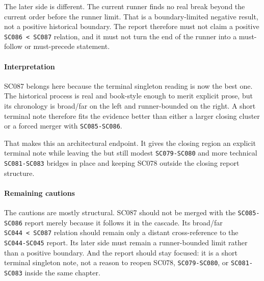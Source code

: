\documentclass[
  british,
  a4paper,
]{article}
\begin{document}
The later side is different. The current runner finds no real break
beyond the current order before the runner limit. That is a
boundary-limited negative result, not a positive historical boundary.
The report therefore must not claim a positive
\texttt{SC086\ \textless{}\ SC087} relation, and it must not turn the
end of the runner into a must-follow or must-precede statement.

\paragraph{Interpretation}\label{interpretation-52}

SC087 belongs here because the terminal singleton reading is now the
best one. The historical process is real and book-style enough to merit
explicit prose, but its chronology is broad/far on the left and
runner-bounded on the right. A short terminal note therefore fits the
evidence better than either a larger closing cluster or a forced merger
with \texttt{SC085-SC086}.

That makes this an architectural endpoint. It gives the closing region
an explicit terminal note while leaving the but still modest
\texttt{SC079-SC080} and more technical \texttt{SC081-SC083} bridges in
place and keeping SC078 outside the closing report structure.

\paragraph{Remaining cautions}\label{remaining-cautions-52}

The cautions are mostly structural. SC087 should not be merged with the
\texttt{SC085-SC086} report merely because it follows it in the cascade.
Its broad/far \texttt{SC044\ \textless{}\ SC087} relation should remain
only a distant cross-reference to the \texttt{SC044-SC045} report. Its
later side must remain a runner-bounded limit rather than a positive
boundary. And the report should stay focused: it is a short terminal
singleton note, not a reason to reopen SC078, \texttt{SC079-SC080}, or
\texttt{SC081-SC083} inside the same chapter.
\end{document}
